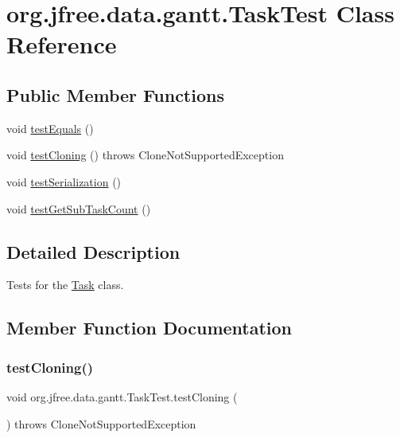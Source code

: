 \hypertarget{classorg_1_1jfree_1_1data_1_1gantt_1_1_task_test}{}\section{org.\+jfree.\+data.\+gantt.\+Task\+Test Class Reference}
\label{classorg_1_1jfree_1_1data_1_1gantt_1_1_task_test}
\subsection*{Public Member Functions}
\begin{DoxyCompactItemize}
\item 
void \mbox{\hyperlink{classorg_1_1jfree_1_1data_1_1gantt_1_1_task_test_a28b76a4d3874fca7e119352d64255e84}{test\+Equals}} ()
\item 
void \mbox{\hyperlink{classorg_1_1jfree_1_1data_1_1gantt_1_1_task_test_a1c09dca8cdcf726bf86cc480dfdefb14}{test\+Cloning}} ()  throws Clone\+Not\+Supported\+Exception 
\item 
void \mbox{\hyperlink{classorg_1_1jfree_1_1data_1_1gantt_1_1_task_test_ab7da30c20f2f33d99e91923f7d612c1f}{test\+Serialization}} ()
\item 
void \mbox{\hyperlink{classorg_1_1jfree_1_1data_1_1gantt_1_1_task_test_a30bee113723af4faba734810da385353}{test\+Get\+Sub\+Task\+Count}} ()
\end{DoxyCompactItemize}


\subsection{Detailed Description}
Tests for the \mbox{\hyperlink{classorg_1_1jfree_1_1data_1_1gantt_1_1_task}{Task}} class. 

\subsection{Member Function Documentation}
\mbox{\label{classorg_1_1jfree_1_1data_1_1gantt_1_1_task_test_a1c09dca8cdcf726bf86cc480dfdefb14}} 
\subsubsection{\texorpdfstring{test\+Cloning()}{testCloning()}}
{\footnotesize\ttfamily void org.\+jfree.\+data.\+gantt.\+Task\+Test.\+test\+Cloning (\begin{DoxyParamCaption}{ }\end{DoxyParamCaption}) throws Clone\+Not\+Supported\+Exception}

